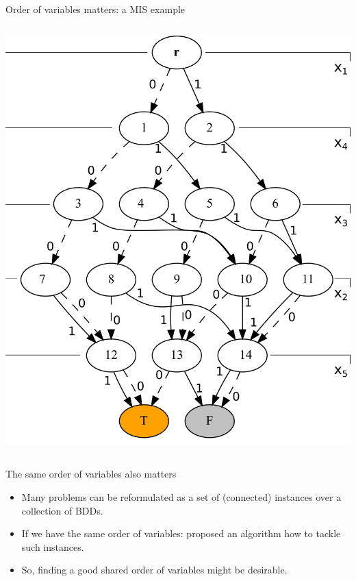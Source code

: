 \documentclass[10pt, xcolor=svgnames]{beamer}
\begin{document}
\begin{frame}[label={sec:org1601c04}]{Order of variables matters: a MIS example}
\begin{columns}
\begin{column}{0.55\columnwidth}
\includegraphics[height=0.7\textheight]{./img/BDDsampleRep2.png}
\end{column}
\end{columns}
\end{frame}
\begin{frame}[label={sec:org1898885}]{The \alert{same} order of variables also matters}
\begin{itemize}
\item Many problems can be reformulated as a set of (connected) instances
over a collection of BDDs.
\item If we have the same order of variables: \cite{lozano2020} proposed an algorithm
how to tackle such instances.
\item So, finding a good shared order of variables might be desirable.
\end{itemize}
\end{frame}
\end{document}
